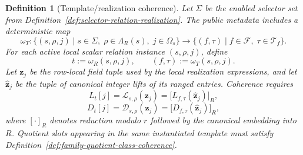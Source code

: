 ﻿\documentclass[11pt]{article}
\newtheorem{definition}[theorem]{Definition}
\newcommand{\wt}[1]{\widehat{#1}}
\begin{document}
\begin{definition}[Template/realization coherence]
\label{def:template-realization-coherence}
Let \(\Sigma\) be the enabled selector set from
Definition~\ref{def:selector-relation-realization}. The public metadata
includes a deterministic map
\[
\omega_T:
\{(s,\rho,j)\mid s\in\Sigma,\;\rho\in\Lambda_R(s),\;j\in\Omega_s\}
\to
\{(f,\tau)\mid f\in\mathcal F,\;\tau\in\mathcal T_f\}.
\]
For each active local scalar relation instance \((s,\rho,j)\), define
\[
t:=\omega_R(s,\rho,j),
\qquad
(f,\tau):=\omega_T(s,\rho,j).
\]
Let \(\mathbf z_j\) be the row-local field tuple used by the local realization
expressions, and let \(\wt{\mathbf z}_j\) be the tuple of canonical integer
lifts of its ranged entries. Coherence requires
\[
L_t[j]
=
\mathcal L_{s,\rho}(\mathbf z_j)
=
\bigl[L_{f,\tau}(\wt{\mathbf z}_j)\bigr]_R,
\]
\[
D_t[j]
=
\mathcal D_{s,\rho}(\mathbf z_j)
=
\bigl[D_{f,\tau}(\wt{\mathbf z}_j)\bigr]_R,
\]
where \([\cdot]_R\) denotes reduction modulo \(r\) followed by the canonical
embedding into \(R\). Quotient slots appearing in the same instantiated
template must satisfy Definition~\ref{def:family-quotient-class-coherence}.
\end{definition}
\end{document}
